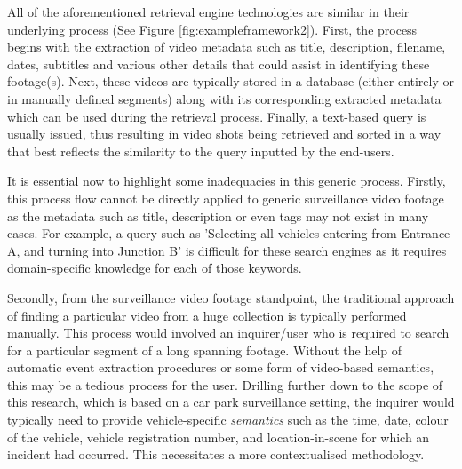 All of the aforementioned retrieval engine technologies are similar
in their underlying process (See Figure \ref{fig:exampleframework2}). First, the process begins with the extraction of video metadata such as title, description, filename, dates, subtitles and various other details that could assist in identifying these footage(s). Next, these videos are typically stored in a database (either entirely or in manually defined segments) along with its corresponding extracted metadata which can be used during the retrieval process. Finally, a text-based query is usually issued, thus resulting in video shots being retrieved and sorted in a way that best
reflects the similarity to
the query inputted by the end-users.

It is essential now to highlight some inadequacies in this generic process. Firstly, this process flow cannot be directly applied to generic surveillance video footage as the metadata such as title, description or even tags may not exist in many cases.
For example, a query such as 'Selecting all vehicles entering from Entrance A, and turning into Junction B'
is difficult for these search engines as it requires domain-specific knowledge
for each of those keywords.

Secondly, from the surveillance video footage standpoint, the traditional approach of finding a particular video from a huge collection is typically performed manually. This process would involved an inquirer/user who is required to search for a particular segment of a long spanning footage. Without the help of automatic event extraction procedures or some form of video-based semantics, this may be a tedious process for the user.
Drilling further down to the scope of this research, which is based on a car park surveillance setting, the inquirer would typically need to provide vehicle-specific \textit{semantics} such as the time, date, colour of the vehicle, vehicle registration number, and location-in-scene for which an incident had occurred. This necessitates a more contextualised methodology. %

